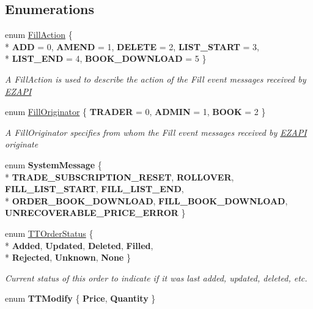\subsection*{Enumerations}
\begin{DoxyCompactItemize}
\item 
enum \hyperlink{namespace_e_z_a_p_i_1_1_containers_ac44efd9b58d9e3746dcc24b165d19169}{Fill\-Action} \{ \\*
{\bfseries A\-D\-D} = 0, 
{\bfseries A\-M\-E\-N\-D} = 1, 
{\bfseries D\-E\-L\-E\-T\-E} = 2, 
{\bfseries L\-I\-S\-T\-\_\-\-S\-T\-A\-R\-T} = 3, 
\\*
{\bfseries L\-I\-S\-T\-\_\-\-E\-N\-D} = 4, 
{\bfseries B\-O\-O\-K\-\_\-\-D\-O\-W\-N\-L\-O\-A\-D} = 5
 \}
\begin{DoxyCompactList}\small\item\em A Fill\-Action is used to describe the action of the Fill event messages received by \hyperlink{namespace_e_z_a_p_i}{E\-Z\-A\-P\-I} \end{DoxyCompactList}\item 
enum \hyperlink{namespace_e_z_a_p_i_1_1_containers_ac4a10657ec0024847b9518e0ad75e16e}{Fill\-Originator} \{ {\bfseries T\-R\-A\-D\-E\-R} = 0, 
{\bfseries A\-D\-M\-I\-N} = 1, 
{\bfseries B\-O\-O\-K} = 2
 \}
\begin{DoxyCompactList}\small\item\em A Fill\-Originator specifies from whom the Fill event messages received by \hyperlink{namespace_e_z_a_p_i}{E\-Z\-A\-P\-I} originate \end{DoxyCompactList}\item 
enum {\bfseries System\-Message} \{ \\*
{\bfseries T\-R\-A\-D\-E\-\_\-\-S\-U\-B\-S\-C\-R\-I\-P\-T\-I\-O\-N\-\_\-\-R\-E\-S\-E\-T}, 
{\bfseries R\-O\-L\-L\-O\-V\-E\-R}, 
{\bfseries F\-I\-L\-L\-\_\-\-L\-I\-S\-T\-\_\-\-S\-T\-A\-R\-T}, 
{\bfseries F\-I\-L\-L\-\_\-\-L\-I\-S\-T\-\_\-\-E\-N\-D}, 
\\*
{\bfseries O\-R\-D\-E\-R\-\_\-\-B\-O\-O\-K\-\_\-\-D\-O\-W\-N\-L\-O\-A\-D}, 
{\bfseries F\-I\-L\-L\-\_\-\-B\-O\-O\-K\-\_\-\-D\-O\-W\-N\-L\-O\-A\-D}, 
{\bfseries U\-N\-R\-E\-C\-O\-V\-E\-R\-A\-B\-L\-E\-\_\-\-P\-R\-I\-C\-E\-\_\-\-E\-R\-R\-O\-R}
 \}
\item 
enum \hyperlink{namespace_e_z_a_p_i_1_1_containers_a195b281517d19ae193243894635d7547}{T\-T\-Order\-Status} \{ \\*
{\bfseries Added}, 
{\bfseries Updated}, 
{\bfseries Deleted}, 
{\bfseries Filled}, 
\\*
{\bfseries Rejected}, 
{\bfseries Unknown}, 
{\bfseries None}
 \}
\begin{DoxyCompactList}\small\item\em Current status of this order to indicate if it was last added, updated, deleted, etc. \end{DoxyCompactList}\item 
enum {\bfseries T\-T\-Modify} \{ {\bfseries Price}, 
{\bfseries Quantity}
 \}
\end{DoxyCompactItemize}
